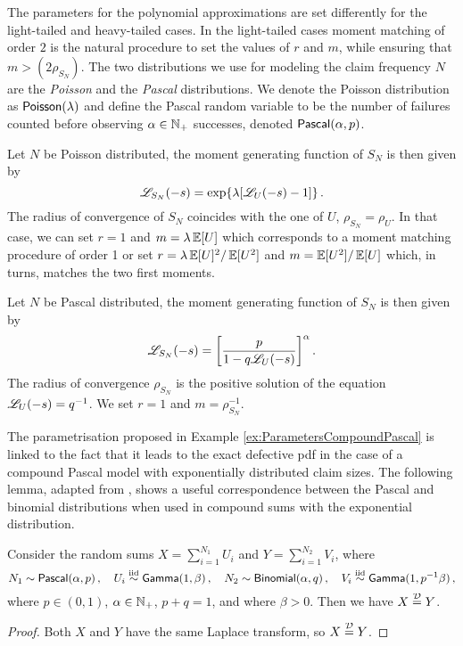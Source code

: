 The parameters for the polynomial approximations are set differently for the light-tailed and heavy-tailed cases. In the light-tailed cases moment matching of order $2$ is the natural procedure to set the values of $r$ and $m$, while ensuring that $m>(2 \rho_{S_N})$. The two distributions we use for modeling the claim frequency $N$ are the \emph{Poisson} and the \emph{Pascal} distributions. We denote the Poisson distribution as $\mathsf{Poisson}(\lambda)$ and define the Pascal random variable to be the number of failures counted before observing $\alpha \in \mathbb{N}_+$ successes, denoted $\mathsf{Pascal}(\alpha,p)$.
\begin{example}\label{ex:ParametersCompoundPoisson}
Let $N$ be Poisson distributed, the moment generating function of $S_N$ is then given by
\[
\mathscr{L}_{S_N}(-s)=\exp \{ \lambda [ \mathscr{L}_{U}(-s)-1 ] \} \,.
\]
The radius of convergence of $S_N$ coincides with the one of $U$, $\rho_{S_N}=\rho_U$. In that case, we can set $r=1$ and $m=\lambda\operatorname{{\mathbb E}}[U]$ which corresponds to a moment matching procedure of order 1 or set $r=\lambda\operatorname{{\mathbb E}}[U]^2/\operatorname{{\mathbb E}}[U^2]$ and $m=\operatorname{{\mathbb E}}[U^2]/\operatorname{{\mathbb E}}[U]$ which, in turns, matches the two first moments.
\end{example}
\begin{example}\label{ex:ParametersCompoundPascal}
Let $N$ be Pascal distributed, the moment generating function of $S_N$ is then given by
$$
\mathscr{L}_{S_N}(-s)=\left[\frac{p}{1-q\mathscr{L}_{U}(-s)}\right]^{\alpha}.
$$
The radius of convergence $\rho_{S_N}$ is the positive solution of the equation $\mathscr{L}_{U}(-s)=q^{-1}$. We set $r=1$ and $m=\rho_{S_N}^{-1}$.
\end{example}
The parametrisation proposed in Example \ref{ex:ParametersCompoundPascal} is linked to the fact that it leads to the exact defective pdf in the case of a compound Pascal model with exponentially distributed claim sizes.
The following lemma, adapted from \cite{PaWi81}, shows a useful correspondence between the Pascal and binomial distributions when used in compound sums with the exponential distribution.
\begin{lemma} \label{lemma:BinomialPascalEquivalence}
Consider the random sums $X = \sum_{i=1}^{N_1} U_i$ and $Y = \sum_{i=1}^{N_2} V_i$, where
\[
N_1 \sim \mathsf{Pascal}(\alpha,p) \,, \quad  U_i \overset{\smash{\mathrm{iid}}}{\sim} \mathsf{Gamma}(1,\beta) \,, \quad  N_2 \sim \mathsf{Binomial}(\alpha,q)  \,, \quad V_i \overset{\smash{\mathrm{iid}}}{\sim} \mathsf{Gamma}(1,p^{-1} \beta) \,,
\]
where $p \in (0,1)$, $\alpha \in \mathbb{N}_+$, $p + q = 1$, and where $\beta > 0$.
Then we have $X \stackrel{\smash{\mathcal{D}}}{=} Y$.
\end{lemma}
\begin{proof}
Both $X$ and $Y$ have the same Laplace transform, so $X \stackrel{\smash{\mathcal{D}}}{=} Y$.
\end{proof}

